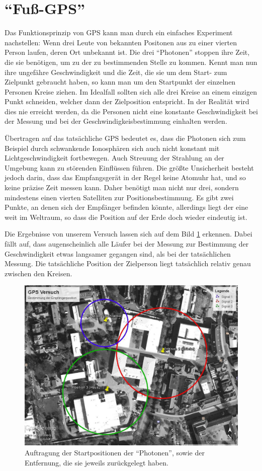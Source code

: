 \documentclass[12pt,a4paper,titlepage,headinclude,bibtotoc]{scrartcl}
\begin{document}
\section{"`Fuß-GPS"'}
Das Funktionsprinzip von GPS kann man durch ein einfaches Experiment nachstellen:
Wenn drei Leute von bekannten Positonen aus zu einer vierten Person laufen, deren Ort unbekannt ist.
Die drei "`Photonen"' stoppen ihre Zeit, die sie benötigen, um zu der zu bestimmenden Stelle zu kommen.
Kennt man nun ihre ungefähre Geschwindigkeit und die Zeit, die sie um dem Start- zum Zielpunkt gebraucht haben, so kann man um den Startpunkt der einzelnen Personen Kreise ziehen.
Im Idealfall sollten sich alle drei Kreise an einem einzigen Punkt schneiden, welcher dann der Zielposition entspricht.
In der Realität wird dies nie erreicht werden, da die Personen nicht eine konstante Geschwindigkeit bei der Messung und bei der Geschwindigkeisbestimmung einhalten werden.

Übertragen auf das tatsächliche GPS bedeutet es, dass die Photonen sich zum Beispiel durch schwankende Ionosphären sich auch nicht konstant mit Lichtgeschwindigkeit fortbewegen.
Auch Streuung der Strahlung an der Umgebung kann zu störenden Einflüssen führen.
Die größte Unsicherheit besteht jedoch darin, dass das Empfangsgerät in der Regel keine Atomuhr hat, und so keine präzise Zeit messen kann.
Daher benötigt man nicht nur drei, sondern mindestens einen vierten Satelliten zur Positionsbestimmung.
Es gibt zwei Punkte, an denen sich der Empfänger befinden könnte, allerdings liegt der eine weit im Weltraum, so dass die Position auf der Erde doch wieder eindeutig ist.

Die Ergebnisse von unserem Versuch lassen sich auf dem Bild \ref{fig:gps} erkennen.
Dabei fällt auf, dass augenscheinlich alle Läufer bei der Messung zur Bestimmung der Geschwindigkeit etwas langsamer gegangen sind, als bei der tatsächlichen Messung.
Die tatsächliche Position der Zielperson liegt tatsächlich relativ genau zwischen den Kreisen.

\begin{figure}[h]
	\centering
	\includegraphics[scale=0.5]{GPS}
	\caption{Auftragung der Startpositionen der "`Photonen"', sowie der Entfernung, die sie jeweils zurückgelegt haben.}
	\label{fig:gps}
\end{figure}
\end{document}
